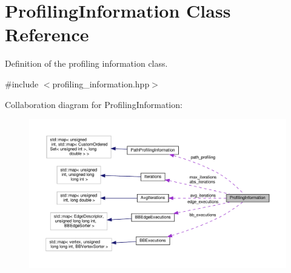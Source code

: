 \hypertarget{classProfilingInformation}{}\section{Profiling\+Information Class Reference}
\label{classProfilingInformation}


Definition of the profiling information class.  




{\ttfamily \#include $<$profiling\+\_\+information.\+hpp$>$}



Collaboration diagram for Profiling\+Information\+:
\nopagebreak
\begin{figure}[H]
\begin{center}
\leavevmode
\includegraphics[width=350pt]{dc/d51/classProfilingInformation__coll__graph}
\end{center}
\end{figure}
